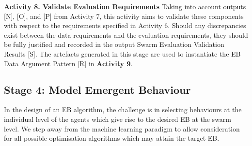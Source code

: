 \documentclass[runningheads]{llncs}
\begin{document}
\noindent\textbf{Activity 8. Validate Evaluation Requirements} Taking into account outputs [N], [O], and [P] from Activity 7, this activity aims to validate these components with respect to the requirements specified in Activity 6. Should any discrepancies exist between the data requirements and the evaluation requirements, they should be fully justified and recorded in the output Swarm Evaluation Validation Results [S]. 
The artefacts generated in this stage are used to instantiate the EB Data Argument Pattern [R] in \textbf{Activity 9}.

\subsection{Stage 4: Model Emergent Behaviour} \label{framework-stage4}
In the design of an EB algorithm, the challenge is in selecting behaviours at the individual level of the agents which give rise to the desired EB at the swarm level. 
We step away from the machine learning paradigm to allow consideration for all possible optimisation algorithms which may attain the target EB.
\end{document}
